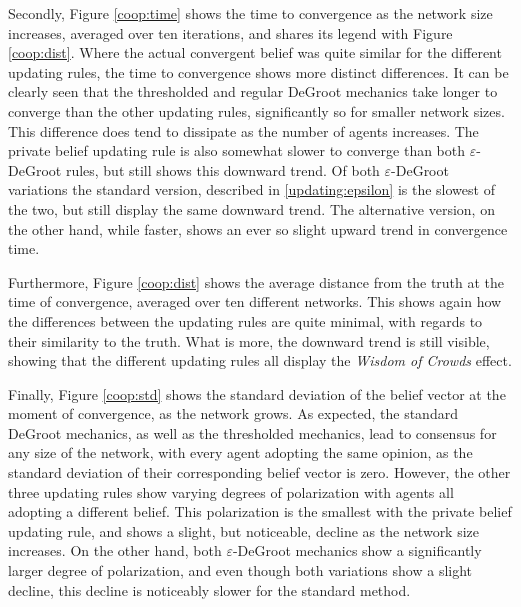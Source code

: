 \documentclass[a4paper, 12pt]{report}
\begin{document}
\noindent Secondly, Figure \ref{coop:time} shows the time to convergence as the network size increases, averaged over ten iterations, and shares its legend with Figure \ref{coop:dist}. Where the actual convergent belief was quite similar for the different updating rules, the time to convergence shows more distinct differences. It can be clearly seen that the thresholded and regular DeGroot mechanics take longer to converge than the other updating rules, significantly so for smaller network sizes. This difference does tend to dissipate as the number of agents increases. The private belief updating rule is also somewhat slower to converge than both $\varepsilon$-DeGroot rules, but still shows this downward trend. Of both $\varepsilon$-DeGroot variations the standard version, described in \ref{updating:epsilon} is the slowest of the two, but still display the same downward trend. The alternative version, on the other hand, while faster, shows an ever so slight upward trend in convergence time.

\noindent Furthermore, Figure \ref{coop:dist} shows the average distance from the truth at the time of convergence, averaged over ten different networks. This shows again how the differences between the updating rules are quite minimal, with regards to their similarity to the truth. What is more, the downward trend is still visible, showing that the different updating rules all display the \emph{Wisdom of Crowds} effect.

\noindent Finally, Figure \ref{coop:std} shows the standard deviation of the belief vector at the moment of convergence, as the network grows. As expected, the standard DeGroot mechanics, as well as the thresholded mechanics, lead to consensus for any size of the network, with every agent adopting the same opinion, as the standard deviation of their corresponding belief vector is zero. However, the other three updating rules show varying degrees of polarization with agents all adopting a different belief. This polarization is the smallest with the private belief updating rule, and shows a slight, but noticeable, decline as the network size increases. On the other hand, both $\varepsilon$-DeGroot mechanics show a significantly larger degree of polarization, and even though both variations show a slight decline, this decline is noticeably slower for the standard method.
\end{document}
